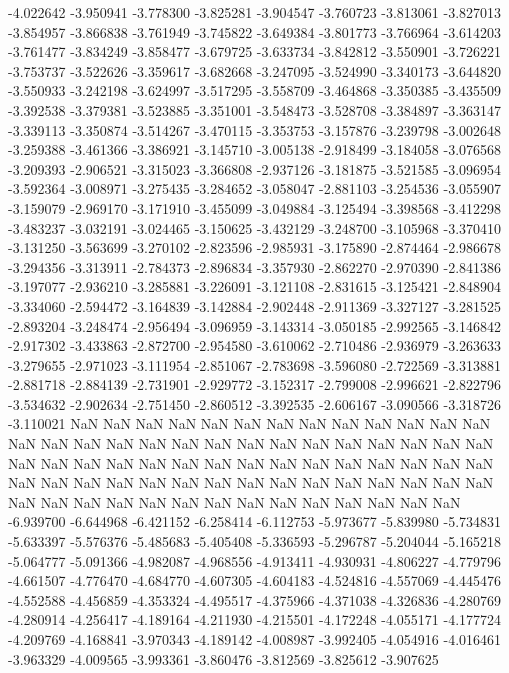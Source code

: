 -4.022642
-3.950941
-3.778300
-3.825281
-3.904547
-3.760723
-3.813061
-3.827013
-3.854957
-3.866838
-3.761949
-3.745822
-3.649384
-3.801773
-3.766964
-3.614203
-3.761477
-3.834249
-3.858477
-3.679725
-3.633734
-3.842812
-3.550901
-3.726221
-3.753737
-3.522626
-3.359617
-3.682668
-3.247095
-3.524990
-3.340173
-3.644820
-3.550933
-3.242198
-3.624997
-3.517295
-3.558709
-3.464868
-3.350385
-3.435509
-3.392538
-3.379381
-3.523885
-3.351001
-3.548473
-3.528708
-3.384897
-3.363147
-3.339113
-3.350874
-3.514267
-3.470115
-3.353753
-3.157876
-3.239798
-3.002648
-3.259388
-3.461366
-3.386921
-3.145710
-3.005138
-2.918499
-3.184058
-3.076568
-3.209393
-2.906521
-3.315023
-3.366808
-2.937126
-3.181875
-3.521585
-3.096954
-3.592364
-3.008971
-3.275435
-3.284652
-3.058047
-2.881103
-3.254536
-3.055907
-3.159079
-2.969170
-3.171910
-3.455099
-3.049884
-3.125494
-3.398568
-3.412298
-3.483237
-3.032191
-3.024465
-3.150625
-3.432129
-3.248700
-3.105968
-3.370410
-3.131250
-3.563699
-3.270102
-2.823596
-2.985931
-3.175890
-2.874464
-2.986678
-3.294356
-3.313911
-2.784373
-2.896834
-3.357930
-2.862270
-2.970390
-2.841386
-3.197077
-2.936210
-3.285881
-3.226091
-3.121108
-2.831615
-3.125421
-2.848904
-3.334060
-2.594472
-3.164839
-3.142884
-2.902448
-2.911369
-3.327127
-3.281525
-2.893204
-3.248474
-2.956494
-3.096959
-3.143314
-3.050185
-2.992565
-3.146842
-2.917302
-3.433863
-2.872700
-2.954580
-3.610062
-2.710486
-2.936979
-3.263633
-3.279655
-2.971023
-3.111954
-2.851067
-2.783698
-3.596080
-2.722569
-3.313881
-2.881718
-2.884139
-2.731901
-2.929772
-3.152317
-2.799008
-2.996621
-2.822796
-3.534632
-2.902634
-2.751450
-2.860512
-3.392535
-2.606167
-3.090566
-3.318726
-3.110021
NaN
NaN
NaN
NaN
NaN
NaN
NaN
NaN
NaN
NaN
NaN
NaN
NaN
NaN
NaN
NaN
NaN
NaN
NaN
NaN
NaN
NaN
NaN
NaN
NaN
NaN
NaN
NaN
NaN
NaN
NaN
NaN
NaN
NaN
NaN
NaN
NaN
NaN
NaN
NaN
NaN
NaN
NaN
NaN
NaN
NaN
NaN
NaN
NaN
NaN
NaN
NaN
NaN
NaN
NaN
NaN
NaN
NaN
NaN
NaN
NaN
NaN
NaN
NaN
NaN
NaN
NaN
NaN
NaN
NaN
NaN
NaN
-6.939700
-6.644968
-6.421152
-6.258414
-6.112753
-5.973677
-5.839980
-5.734831
-5.633397
-5.576376
-5.485683
-5.405408
-5.336593
-5.296787
-5.204044
-5.165218
-5.064777
-5.091366
-4.982087
-4.968556
-4.913411
-4.930931
-4.806227
-4.779796
-4.661507
-4.776470
-4.684770
-4.607305
-4.604183
-4.524816
-4.557069
-4.445476
-4.552588
-4.456859
-4.353324
-4.495517
-4.375966
-4.371038
-4.326836
-4.280769
-4.280914
-4.256417
-4.189164
-4.211930
-4.215501
-4.172248
-4.055171
-4.177724
-4.209769
-4.168841
-3.970343
-4.189142
-4.008987
-3.992405
-4.054916
-4.016461
-3.963329
-4.009565
-3.993361
-3.860476
-3.812569
-3.825612
-3.907625
